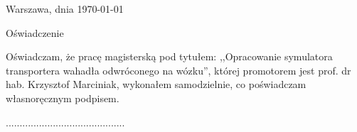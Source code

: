 \documentclass[12pt, oneside]{report}
\theoremstyle{definition}
\begin{document}
\clearpage
\pagestyle{empty}
\noindent Warszawa, dnia \today
\vspace{5cm}
\begin{center}
	\LARGE{Oświadczenie}
\end{center}
Oświadczam, że pracę magisterską pod tytułem: ,,Opracowanie symulatora transportera wahadła odwróconego na wózku'', której promotorem jest prof. dr hab. Krzysztof Marciniak, wykonałem samodzielnie, co poświadczam własnoręcznym podpisem.
\vspace{2cm}
\begin{flushright}
...........................................
\end{flushright}
\end{document}
